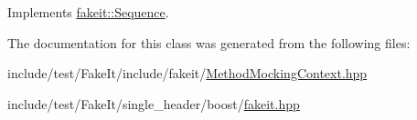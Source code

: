 Implements \mbox{\hyperlink{classfakeit_1_1Sequence_aa9a45b45fc715148832a9dfb7b555556}{fakeit\+::\+Sequence}}.



The documentation for this class was generated from the following files\+:\begin{DoxyCompactItemize}
\item 
include/test/\+Fake\+It/include/fakeit/\mbox{\hyperlink{MethodMockingContext_8hpp}{Method\+Mocking\+Context.\+hpp}}\item 
include/test/\+Fake\+It/single\+\_\+header/boost/\mbox{\hyperlink{single__header_2boost_2fakeit_8hpp}{fakeit.\+hpp}}\end{DoxyCompactItemize}
